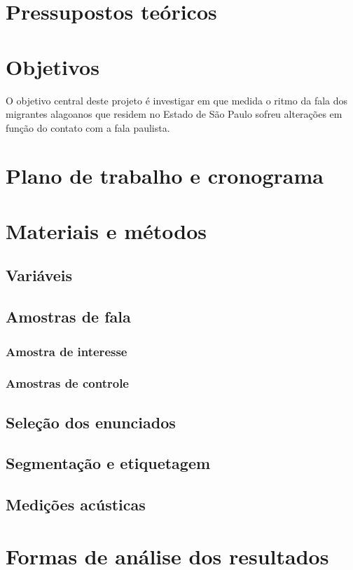 \documentclass[
    a4paper,	%
    12pt,	%
    ]{article}	%
\begin{document}
\section{Pressupostos teóricos} 
\label{pressup}

\section{Objetivos} 
\label{objetivos}

O objetivo central deste projeto é investigar em que medida o ritmo da fala dos
migrantes alagoanos que residem no Estado de São Paulo sofreu alterações em
função do contato com a fala paulista.

\section{Plano de trabalho e cronograma} 
\label{plano}
	
\section{Materiais e métodos} 
\label{metodo}

	\subsection{Variáveis} 
	\label{variaveis}

	\subsection{Amostras de fala} 
	\label{amostra}
	
		\subsubsection{Amostra de interesse} 
		\label{amostra-int}
		
		\subsubsection{Amostras de controle} 
		\label{amostra-con}

	\subsection{Seleção dos enunciados} 
	\label{selecao}

	\subsection{Segmentação e etiquetagem} 
	\label{segm}

	\subsection{Medições acústicas} 
	\label{medicoes}
	
\section{Formas de análise dos resultados} 
\label{analise}

{ %
	\printbibliography
}
\end{document}
